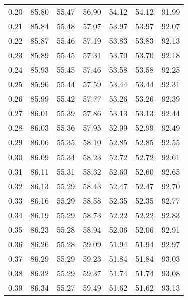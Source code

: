 \begin{tabular}{|c|c|c|c|c|c|c|}
      0.20 &     85.80 &     55.47 &      56.90 &   54.12 &      54.12 &         91.99 \\
      0.21 &     85.84 &     55.48 &      57.07 &   53.97 &      53.97 &         92.07 \\
      0.22 &     85.87 &     55.46 &      57.19 &   53.83 &      53.83 &         92.13 \\
      0.23 &     85.89 &     55.45 &      57.31 &   53.70 &      53.70 &         92.18 \\
      0.24 &     85.93 &     55.45 &      57.46 &   53.58 &      53.58 &         92.25 \\
      0.25 &     85.96 &     55.44 &      57.59 &   53.44 &      53.44 &         92.31 \\
      0.26 &     85.99 &     55.42 &      57.77 &   53.26 &      53.26 &         92.39 \\
      0.27 &     86.01 &     55.39 &      57.86 &   53.13 &      53.13 &         92.44 \\
      0.28 &     86.03 &     55.36 &      57.95 &   52.99 &      52.99 &         92.49 \\
      0.29 &     86.06 &     55.35 &      58.10 &   52.85 &      52.85 &         92.55 \\
      0.30 &     86.09 &     55.34 &      58.23 &   52.72 &      52.72 &         92.61 \\
      0.31 &     86.11 &     55.31 &      58.32 &   52.60 &      52.60 &         92.65 \\
      0.32 &     86.13 &     55.29 &      58.43 &   52.47 &      52.47 &         92.70 \\
      0.33 &     86.16 &     55.29 &      58.58 &   52.35 &      52.35 &         92.77 \\
      0.34 &     86.19 &     55.29 &      58.73 &   52.22 &      52.22 &         92.83 \\
      0.35 &     86.23 &     55.28 &      58.94 &   52.06 &      52.06 &         92.91 \\
      0.36 &     86.26 &     55.28 &      59.09 &   51.94 &      51.94 &         92.97 \\
      0.37 &     86.29 &     55.29 &      59.23 &   51.84 &      51.84 &         93.03 \\
      0.38 &     86.32 &     55.29 &      59.37 &   51.74 &      51.74 &         93.08 \\
      0.39 &     86.34 &     55.27 &      59.49 &   51.62 &      51.62 &         93.13 \\

\end{tabular}
